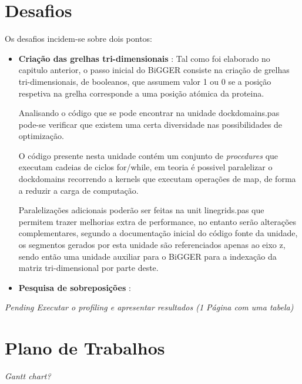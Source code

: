 \section {Desafios}
\label{challenges}
Os desafios incidem-se sobre dois pontos:
\begin{itemize}
\item{\textbf{Criação das grelhas tri-dimensionais}} : 
Tal como foi elaborado no capitulo anterior, o passo inicial do BiGGER consiste na criação de grelhas tri-dimensionais, de booleanos, que assumem valor 1 ou 0 se a posição respetiva na grelha corresponde a uma posição atómica da proteina. 

Analisando o código que se pode encontrar na unidade dockdomains.pas pode-se verificar que existem uma certa diversidade nas possibilidades de optimização.  

O código presente nesta unidade contém um conjunto de \textit{procedures} que executam cadeias de ciclos for/while, em teoria é possivel paralelizar o dockdomains recorrendo a kernels que executam operações de map, de forma a reduzir a carga de computação.

Paralelizações adicionais poderão ser feitas na unit linegrids.pas que permitem trazer melhorias extra de performance, no entanto serão alterações complementares, segundo a documentação inicial do código fonte da unidade, os segmentos gerados por esta unidade são referenciados apenas ao eixo z, sendo então uma unidade auxiliar para o BiGGER para a indexação da matriz tri-dimensional por parte deste.

\item{\textbf{Pesquisa de sobreposições}} : 
\end{itemize}
\textit{Pending Executar o profiling e apresentar resultados (1 Página com uma tabela)}
\section{Plano de Trabalhos} %
\label{sec:dealing_with_bibliogrpahy}
\textit{Gantt chart?}


%
%
%

